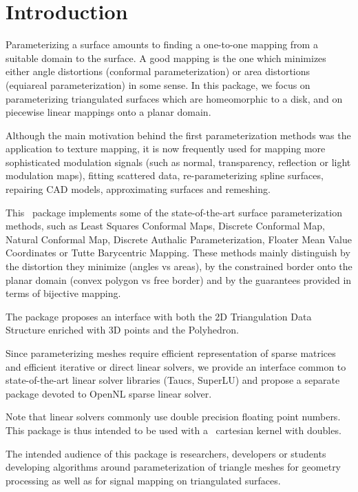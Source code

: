 \section{Introduction}

Parameterizing a surface amounts to finding a one-to-one mapping from
a suitable domain to the surface. A good mapping is the one which
minimizes either angle distortions (conformal parameterization) or
area distortions (equiareal parameterization) in some sense.  In this
package, we focus on parameterizing triangulated surfaces which are
homeomorphic to a disk, and on piecewise linear mappings onto a planar
domain.

Although the main motivation behind the first parameterization methods
was the application to texture mapping, it is now frequently used for
mapping more sophisticated modulation signals (such as normal,
transparency, reflection or light modulation maps), fitting scattered
data, re-parameterizing spline surfaces, repairing CAD models,
approximating surfaces and remeshing.

This \cgal\ package implements some of the state-of-the-art
surface parameterization methods, such as Least Squares Conformal Maps,
Discrete Conformal Map, Natural Conformal Map, Discrete Authalic
Parameterization, Floater Mean Value Coordinates or Tutte Barycentric
Mapping. These methods mainly distinguish by the distortion they
minimize (angles vs areas), by the constrained border onto the
planar domain (convex polygon vs free border) and by the guarantees
provided in terms of bijective mapping.

The package proposes an interface with both the 2D Triangulation Data
Structure enriched with 3D points and the Polyhedron.

Since parameterizing meshes require efficient representation of sparse
matrices and efficient iterative or direct linear solvers, we provide
an interface common to state-of-the-art linear solver libraries ({\sc Taucs},
SuperLU) and propose a separate package devoted to OpenNL sparse
linear solver.

Note that linear solvers commonly use double precision floating point
numbers. This package is thus intended to be used with a \cgal\
cartesian kernel with doubles.

The intended audience of this package is researchers, developers or
students developing algorithms around parameterization of triangle
meshes for geometry processing as well as for signal mapping on
triangulated surfaces.

